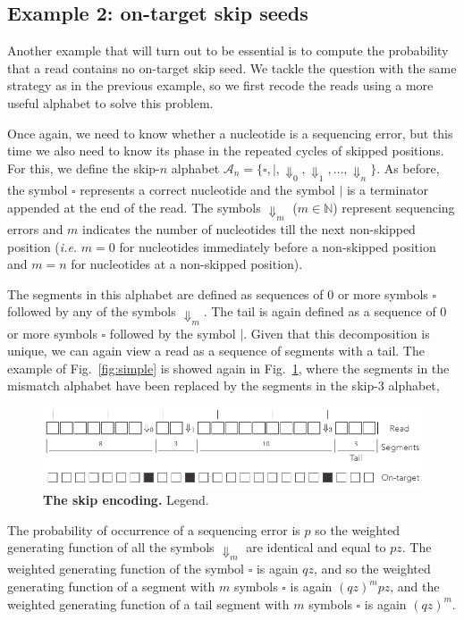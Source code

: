 \documentclass{article}
\begin{document}
\subsection{Example 2: on-target skip seeds}

Another example that will turn out to be essential is to compute the
probability that a read contains no on-target skip seed. We tackle the
question with the same strategy as in the previous example, so we first
recode the reads using a more useful alphabet to solve this problem.

Once again, we need to know whether a nucleotide is a sequencing error,
but this time we also need to know its phase in the repeated cycles of
skipped positions. For this, we define the skip-$n$ alphabet
$\mathcal{A}_n = \{\square, |, \Downarrow_0, \Downarrow_1, \ldots,
\Downarrow_n \}$. As before, the symbol $\square$ represents a correct
nucleotide and the symbol $|$ is a terminator appended at the end of the
read. The symbols $\Downarrow_m$ ($m \in \mathbb{N}$) represent sequencing
errors and $m$ indicates the number of nucleotides till the next
non-skipped position (\textit{i.e.} $m=0$ for nucleotides immediately
before a non-skipped position and $m=n$ for nucleotides at a non-skipped
position).

The segments in this alphabet are defined as sequences of 0 or more
symbols $\square$ followed by any of the symbols $\Downarrow_m$. The tail
is again defined as a sequence of 0 or more symbols $\square$ followed by
the symbol $|$. Given that this decomposition is unique, we can again view
a read as a sequence of segments with a tail. The example of
Fig.~\ref{fig:simple} is showed again in Fig.~\ref{fig:skip}, where the
segments in the mismatch alphabet have been replaced by the segments in
the skip-3 alphabet,

\begin{figure}[h]
\centering
\includegraphics[scale=0.85]{sketch_skip.pdf}
\caption{\textbf{The skip encoding.}
Legend.}
\label{fig:skip}
\end{figure}

The probability of occurrence of a sequencing error is $p$ so the weighted
generating function of all the symbols $\Downarrow_m$ are identical and
equal to $pz$. The weighted generating function of the symbol $\square$ is
again $qz$, and so the weighted generating function of a segment with $m$
symbols $\square$ is again $(qz)^mpz$, and the weighted generating
function of a tail segment with $m$ symbols $\square$ is again $(qz)^m$.
\end{document}
